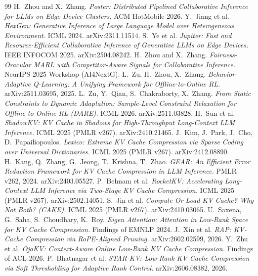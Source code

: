 \documentclass[11pt]{article}
\begin{document}
\begin{thebibliography}{99}
\small
 H.~Zhou and X.~Zhang. \emph{Poster: Distributed Pipelined Collaborative Inference for LLMs on Edge Device Clusters.} ACM HotMobile 2026.
 Y.~Jiang et al. \emph{HexGen: Generative Inference of Large Language Model over Heterogeneous Environment.} ICML 2024. arXiv:2311.11514.
 S.~Ye et al. \emph{Jupiter: Fast and Resource-Efficient Collaborative Inference of Generative LLMs on Edge Devices.} IEEE INFOCOM 2025. arXiv:2504.08242.
 H.~Zhou and X.~Zhang. \emph{Fairness-Oracular MARL with Competitor-Aware Signals for Collaborative Inference.} NeurIPS 2025 Workshop (AI4NextG).
 L.~Zu, H.~Zhou, X.~Zhang. \emph{Behavior-Adaptive Q-Learning: A Unifying Framework for Offline-to-Online RL.} arXiv:2511.03695, 2025.
 L.~Zu, Y.~Qian, S.~Chakraborty, X.~Zhang. \emph{From Static Constraints to Dynamic Adaptation: Sample-Level Constraint Relaxation for Offline-to-Online RL (DARE).} ICML 2026. arXiv:2511.03828.
 H.~Sun et al. \emph{ShadowKV: KV Cache in Shadows for High-Throughput Long-Context LLM Inference.} ICML 2025 (PMLR v267). arXiv:2410.21465.
 J.~Kim, J.~Park, J.~Cho, D.~Papailiopoulos. \emph{Lexico: Extreme KV Cache Compression via Sparse Coding over Universal Dictionaries.} ICML 2025 (PMLR v267). arXiv:2412.08890.
 H.~Kang, Q.~Zhang, G.~Jeong, T.~Krishna, T.~Zhao. \emph{GEAR: An Efficient Error Reduction Framework for KV Cache Compression in LLM Inference.} PMLR v262, 2024. arXiv:2403.05527.
 P.~Behnam et al. \emph{RocketKV: Accelerating Long-Context LLM Inference via Two-Stage KV Cache Compression.} ICML 2025 (PMLR v267). arXiv:2502.14051.
 S.~Jin et al. \emph{Compute Or Load KV Cache? Why Not Both? (CAKE).} ICML 2025 (PMLR v267). arXiv:2410.03065.
 U.~Saxena, G.~Saha, S.~Choudhary, K.~Roy. \emph{Eigen Attention: Attention in Low-Rank Space for KV Cache Compression.} Findings of EMNLP 2024.
 J.~Xin et al. \emph{RAP: KV-Cache Compression via RoPE-Aligned Pruning.} arXiv:2602.02599, 2026.
 Y.~Zhu et al. \emph{OjaKV: Context-Aware Online Low-Rank KV Cache Compression.} Findings of ACL 2026.
 P.~Bhatnagar et al. \emph{STAR-KV: Low-Rank KV Cache Compression via Soft Thresholding for Adaptive Rank Control.} arXiv:2606.08382, 2026.

\end{thebibliography}
\end{document}
